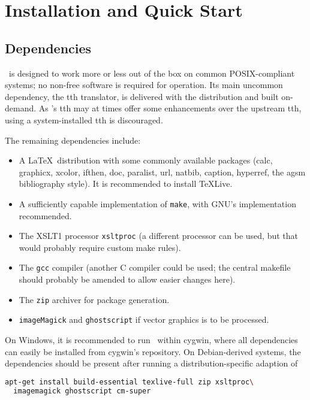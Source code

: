 \documentclass[11pt,a4paper]{ivoa}
\begin{document}
\section{Installation and Quick Start}
\label{sect:quick}

\subsection{Dependencies}

\ivoatex\ is designed to work more or less out of the box on common
POSIX-compliant systems; no non-free software is required for operation.
Its main uncommon dependency, the tth translator, is delivered with the
distribution and built on-demand.  As \ivoatex's tth may at times offer
some enhancements over the upstream tth, using a system-installed tth is
discouraged.

The remaining dependencies include:

\begin{itemize}
\item A \LaTeX\ distribution with some commonly available packages (calc,
graphicx, xcolor, ifthen, doc, paralist, url, natbib, caption, hyperref,
the agsm bibliography style).  It is recommended to install TeXLive.
\item A sufficiently capable implementation of \texttt{make}, with GNU's
implementation recommended.
\item The XSLT1 processor \texttt{xsltproc} (a different processor can
be used, but that would probably require custom make rules).
\item The \texttt{gcc} compiler (another C compiler could be used; the
central makefile should probably be amended to allow easier changes
here).
\item The \texttt{zip} archiver for package generation.
\item \texttt{imageMagick} and \texttt{ghostscript} if vector graphics
is to be processed.
\end{itemize}

On Windows, it is recommended to run \ivoatex\ within cygwin, where all
dependencies can easily be installed from cygwin's repository.  On
Debian-derived systems, the dependencies should be present after
running a distribution-specific adaption of

\begin{lstlisting}[language=sh]
apt-get install build-essential texlive-full zip xsltproc\
  imagemagick ghostscript cm-super
\end{lstlisting}
\end{document}
